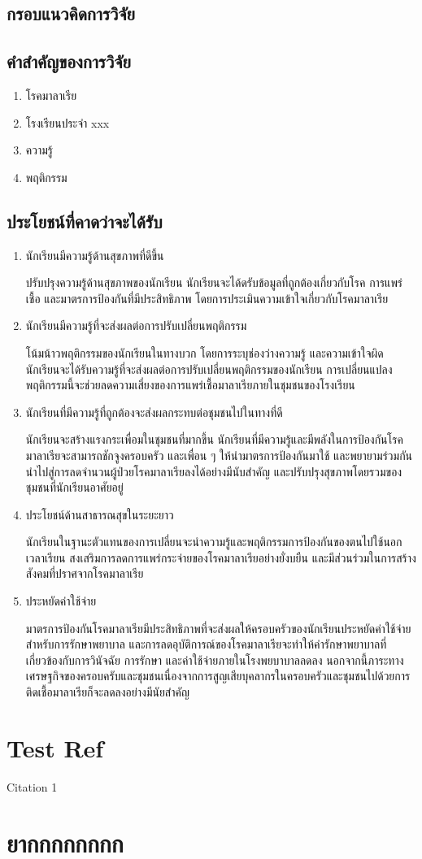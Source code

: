 \documentclass[12pt,twoside]{report}
\begin{document}
\subsection{กรอบแนวคิดการวิจัย}

\subsection{คำสำคัญของการวิจัย}
\begin{enumerate}
    \item โรคมาลาเรีย
    \item โรงเรียนประจำ xxx
    \item ความรู้
    \item พฤติกรรม
\end{enumerate}

\subsection{ประโยชน์ที่คาดว่าจะได้รับ}
\begin{enumerate}
    \item นักเรียนมีความรู้ด้านสุขภาพที่ดีขึ้น

          ปรับปรุงความรู้ด้านสุขภาพของนักเรียน นักเรียนจะได้ดรับข้อมูลที่ถูกต้องเกี่ยวกับโรค การแพร่เชื้อ และมาตรการป้องกันที่มีประสิทธิภาพ โดยการประเมินความเข้าใจเกี่ยวกับโรคมาลาเรีย
    \item นักเรียนมีความรู้ที่จะส่งผลต่อการปรับเปลี่ยนพฤติกรรม

          โน้มน้าวพฤติกรรมของนักเรียนในทางบวก โดยการระบุช่องว่างความรู้ และความเข้าใจผิด นักเรียนจะได้รับความรู้ที่จะส่งผลต่อการปรับเปลี่ยนพฤติกรรมของนักเรียน การเปลี่ยนแปลงพฤติกรรมนี้จะช่วยลดความเสี่ยงของการแพร่เชื้อมาลาเรียภายในชุมชนของโรงเรียน
    \item นักเรียนที่มีความรู้ที่ถูกต้องจะส่งผลกระทบต่อชุมชนไปในทางที่ดี

          นักเรียนจะสร้างแรงกระเพื่อมในชุมชนที่มากขึ้น นักเรียนที่มีความรู้และมีพลังในการป้องกันโรคมาลาเรียจะสามารถชักจูงครอบครัว และเพื่อน ๆ ให้นำมาตรการป้องกันมาใช้ และพยายามร่วมกันนำไปสู่การลดจำนวนผู้ป่วยโรคมาลาเรียลงได้อย่างมีนับสำคัญ และปรับปรุงสุขภาพโดยรวมของชุมชนที่นักเรียนอาศัยอยู่
    \item ประโยชน์ด้านสาธารณสุขในระยะยาว

          นักเรียนในฐานะตัวแทนของการเปลี่ยนจะนำความรู้และพฤติกรรมการป้องกันของตนไปใช้นอกเวลาเรียน สงเสริมการลดการแพร่กระจ่ายของโรคมาลาเรียอย่างยั่งบยืน และมีส่วนร่วมในการสร้างสังคมที่ปราศจากโรคมาลาเรีย
    \item 	ประหยัดค่าใช้จ่าย

          มาตรการป้องกันโรคมาลาเรียมีประสิทธิภาพที่จะส่งผลให้ครอบครัวของนักเรียนประหยัดค่าใช้จ่ายสำหรับการรักษาพยาบาล และการลดอุบัติการณ์ของโรคมาลาเรียจะทำให้ค่ารักษาพยาบาลที่เกี่ยวข้องกับการวินัจฉัย การรักษา และค่าใช้จ่ายภายในโรงพยบาบาลลดลง นอกจากนี้ภาระทางเศรษฐกิจของครอบครับและชุมชนเนื่องจากการสูญเสียบุคลากรในครอบครัวและชุมชนไปด้วยการติดเชื้อมาลาเรียก็จะลดลงอย่างมีนัยสำคัญ
\end{enumerate}
\newpage

\section{Test Ref}
Citation 1 \cite{test01}
\section{ยากกกกกกกก}


\end{document}
